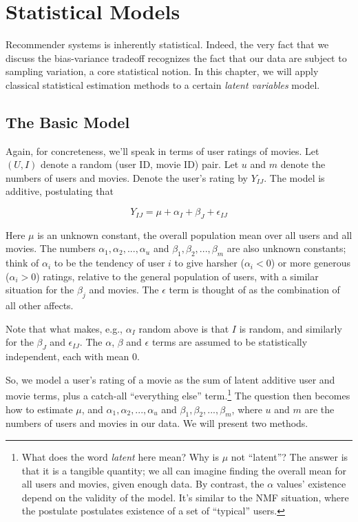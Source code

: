 \chapter{Statistical Models}  
\label{chap:mixed}  

Recommender systems is inherently statistical.  Indeed, the very fact
that we discuss the bias-variance tradeoff recognizes the fact that our
data are subject to sampling variation, a core statistical notion.  In
this chapter, we will apply classical statistical estimation methods to
a certain \textit{latent variables} model.

\section{The Basic Model}

Again, for concreteness, we'll speak in terms of user ratings of movies.
Let $(U,I)$ denote a random (user ID, movie ID) pair.  Let $u$ and $m$
denote the numbers of users and movies.  Denote the user's rating by
$Y_{IJ}$.  The model is additive, postulating that

\begin{equation}
\label{basicmodel}
Y_{IJ} = \mu + \alpha_I + \beta_J + \epsilon_{IJ}
\end{equation}

Here $\mu$ is an unknown constant, the overall population mean over all
users and all movies.  The numbers $\alpha_1, \alpha_2,...,\alpha_u$ and
$\beta_1, \beta_2,...,\beta_m$ are also unknown constants; think of $\alpha_i$
to be the tendency of user $i$ to give harsher ($\alpha_i < 0$) or more
generous ($\alpha_i > 0$) ratings, relative to the general population of
users, with a similar situation for the $\beta_j$ and movies.  The
$\epsilon$ term is thought of as the combination of all other affects.

Note that what makes, e.g., $\alpha_I$ random above is that $I$ is
random, and similarly for the $\beta_J$ and $\epsilon_{IJ}$.  The
$\alpha$, $\beta$ and $\epsilon$ terms are assumed to be statistically
independent, each with mean 0.

So, we model a user's rating of a movie as the sum of latent additive
user and movie terms, plus a catch-all ``everything else''
term.\footnote{What does the word \textit{latent} here mean?  Why is
$\mu$ not ``latent''?  The answer is that it is a tangible quantity; we
all can imagine finding the overall mean for all users and movies, given
enough data.  By contrast, the $\alpha$ values' existence depend on the
validity of the model.  It's similar to the NMF situation, where the
postulate postulates existence of a set of ``typical'' users.}  The
question then becomes how to estimate $\mu$, and $\alpha_1,
\alpha_2,...,\alpha_u$ and $\beta_1, \beta_2,...,\beta_m$, where $u$ and
$m$ are the numbers of users and movies in our data.  We will present
two methods.

